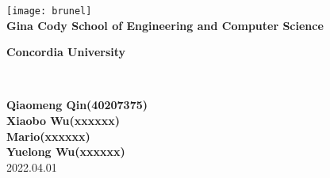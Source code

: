 \begin{titlepage}
  \begin{center}
    \texttt{[image: brunel]}\\[1cm]

    \textbf{\large Gina Cody School of Engineering and Computer Science}\\[0.5cm]


    \begin{doublespace}
      \textbf{\LARGE Concordia University}\\[2.75cm]
    \end{doublespace}

    \begin{doublespace}
      \textbf{\LARGE \Title}\\[2.75cm]
    \end{doublespace}

    \textbf{\large Qiaomeng Qin(40207375)}\\[0.5cm]
    \textbf{\large Xiaobo Wu(xxxxxx)}\\[0.5cm]
    \textbf{\large Mario(xxxxxx)}\\[0.5cm]
    \textbf{\large Yuelong Wu(xxxxxx)}\\[0.5cm]

    \vfill
    \textsc{\footnotesize{2022.04.01}}\\

  \end{center}


\end{titlepage}
